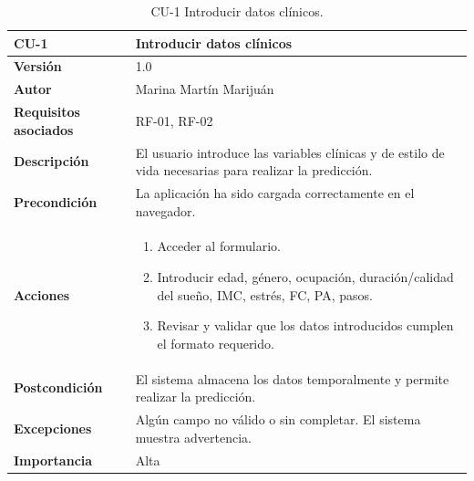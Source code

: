 \begin{table}[!htbp]
	\centering
	\begin{tabularx}{\linewidth}{ p{} p{} }
		\toprule
		\textbf{CU-1}    & Introducir datos clínicos \\
		\toprule
		\textbf{Versión}              & 1.0    \\
		\textbf{Autor}                & Marina Martín Marijuán \\
		\textbf{Requisitos asociados} & RF-01, RF-02 \\
		\textbf{Descripción}          & El usuario introduce las variables clínicas y de estilo de vida necesarias para realizar la predicción. \\
		\textbf{Precondición}         & La aplicación ha sido cargada correctamente en el navegador. \\
		\textbf{Acciones}             &
		\begin{enumerate}
			\item Acceder al formulario.
			\item Introducir edad, género, ocupación, duración/calidad del sueño, IMC, estrés, FC, PA, pasos.
			\item Revisar y validar que los datos introducidos cumplen el formato requerido.
		\end{enumerate}\\
		\textbf{Postcondición}        & El sistema almacena los datos temporalmente y permite realizar la predicción. \\
		\textbf{Excepciones}          & Algún campo no válido o sin completar. El sistema muestra advertencia. \\
		\textbf{Importancia}          & Alta \\
		\bottomrule
	\end{tabularx}
	\caption{CU-1 Introducir datos clínicos.}
\end{table}

